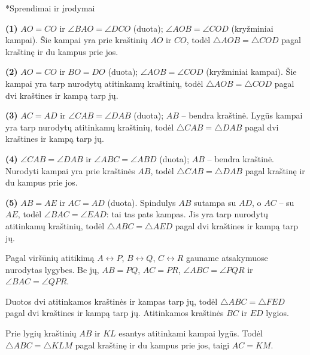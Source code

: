 \documentclass[12pt,a4paper,reqno]{amsart}
\makeatletter
\def\section{\@startsection{section}{1}{\z@}{-1.5\baselineskip plus -.3\baselineskip minus -.2\baselineskip}{0.6\baselineskip}{\normalfont\large\bfseries\raggedright}}
\theoremstyle{plain}\newtheorem{theorem}{Teorema}[section]
\theoremstyle{definition}
\theoremstyle{remark}\newtheorem{remark}[theorem]{Pastaba}\newtheorem*{remark*}{Pastaba}
\theoremstyle{definition}\newtheorem*{problem*}{Uždavinys}
\makeatother
\begin{document}
\section*{Sprendimai ir įrodymai}
\begin{solution}[\ref{uzd:breziniai-lygumas-01}]
\textbf{(1)} $AO=CO$ ir $\angle BAO=\angle DCO$ (duota); $\angle AOB=\angle COD$ (kryžminiai kampai). Šie kampai yra prie kraštinių $AO$ ir $CO$, todėl $\triangle AOB=\triangle COD$ pagal kraštinę ir du kampus prie jos.\par
\textbf{(2)} $AO=CO$ ir $BO=DO$ (duota); $\angle AOB=\angle COD$ (kryžminiai kampai). Šie kampai yra tarp nurodytų atitinkamų kraštinių, todėl $\triangle AOB=\triangle COD$ pagal dvi kraštines ir kampą tarp jų.\par
\textbf{(3)} $AC=AD$ ir $\angle CAB=\angle DAB$ (duota); $AB$ – bendra kraštinė. Lygūs kampai yra tarp nurodytų atitinkamų kraštinių, todėl $\triangle CAB=\triangle DAB$ pagal dvi kraštines ir kampą tarp jų.\par
\textbf{(4)} $\angle CAB=\angle DAB$ ir $\angle ABC=\angle ABD$ (duota); $AB$ – bendra kraštinė. Nurodyti kampai yra prie kraštinės $AB$, todėl $\triangle CAB=\triangle DAB$ pagal kraštinę ir du kampus prie jos.\par
\textbf{(5)} $AB=AE$ ir $AC=AD$ (duota). Spindulys $AB$ sutampa su $AD$, o $AC$ – su $AE$, todėl $\angle BAC=\angle EAD$: tai tas pats kampas. Jis yra tarp nurodytų atitinkamų kraštinių, todėl $\triangle ABC=\triangle AED$ pagal dvi kraštines ir kampą tarp jų.\par
\end{solution}
\begin{solution}[\ref{uzd:lygybe-atitikimas-01}] Pagal viršūnių atitikimą $A\leftrightarrow P$, $B\leftrightarrow Q$, $C\leftrightarrow R$ gauname atsakymuose nurodytas lygybes. Be jų, $AB=PQ$, $AC=PR$, $\angle ABC=\angle PQR$ ir $\angle BAC=\angle QPR$. \end{solution}
\begin{solution}[\ref{uzd:lygybe-sas-01}] Duotos dvi atitinkamos kraštinės ir kampas tarp jų, todėl $\triangle ABC=\triangle FED$ pagal dvi kraštines ir kampą tarp jų. Atitinkamos kraštinės $BC$ ir $ED$ lygios. \end{solution}
\begin{solution}[\ref{uzd:lygybe-asa-01}] Prie lygių kraštinių $AB$ ir $KL$ esantys atitinkami kampai lygūs. Todėl $\triangle ABC=\triangle KLM$ pagal kraštinę ir du kampus prie jos, taigi $AC=KM$. \end{solution}
\end{document}
